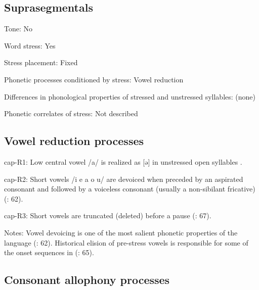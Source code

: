 {\subsection*{Suprasegmentals}
\begin{appendixdesc}
\item[Tone:] No

\item[Word stress:] Yes

\item[Stress placement:] Fixed

\item[Phonetic processes conditioned by stress:] Vowel reduction

\item[Differences in phonological properties of stressed and unstressed syllables:] (none)

\item[Phonetic correlates of stress:] Not described
\end{appendixdesc}
\subsection*{Vowel reduction processes}
\begin{appendixdesc}

\item[cap-R1:] Low central vowel /a/ is realized as [ə] in unstressed open syllables \citep[301]{Olson1967}.

\item[cap-R2:] Short vowels /i e a o u/ are devoiced when preceded by an aspirated consonant and followed by a voiceless consonant (usually a non-sibilant fricative) (\citealt{Cerrón-Palomino2006}: 62).

\item[cap-R3:] Short vowels are truncated (deleted) before a pause (\citealt{Cerrón-Palomino2006}: 67).

\item[Notes:] Vowel devoicing is one of the most salient phonetic properties of the language (\citealt{Cerrón-Palomino2006}: 62). Historical elision of pre-stress vowels is responsible for some of the onset sequences in  (\citealt{Cerrón-Palomino2006}: 65).
\end{appendixdesc}
\subsection*{Consonant allophony processes}
\begin{appendixdesc}


\end{appendixdesc}}

